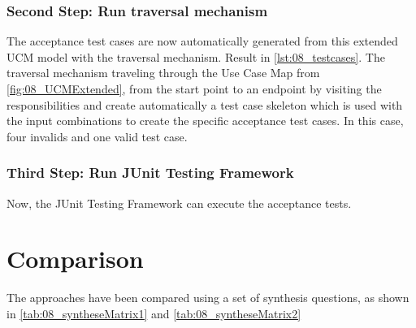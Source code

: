 \subsubsection{Second Step: Run traversal mechanism}
The acceptance test cases are now automatically generated from this extended UCM model with the traversal mechanism. Result in \autoref{lst:08_testcases}. The traversal mechanism traveling through the Use Case Map from \autoref{fig:08_UCMExtended}, from the start point to an endpoint by visiting the responsibilities and create automatically a test case skeleton which is used with the input combinations to create the specific acceptance test cases. In this case, four invalids and one valid test case.



\subsubsection{Third Step: Run JUnit Testing Framework}
Now, the JUnit Testing Framework can execute the acceptance tests.
\section{Comparison}
\label{topic08:sectionComparison}

The approaches have been compared using a set of synthesis questions, as shown in \autoref{tab:08_syntheseMatrix1} and \autoref{tab:08_syntheseMatrix2}


